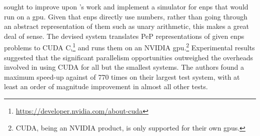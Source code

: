 
\citeauthor{Raghavan2020} \cite{Raghavan2020} sought to improve upon \citeauthor{Florea2018}'s work \cite{Florea2018} and implement a simulator for \gls{enps} that would run on a \gls{gpu}.  Given that \gls{enps} directly use numbers, rather than going through an abstract representation of them such as unary arithmetic, this makes a great deal of sense.  The devised system translates PeP representations of given \gls{enps} problems to CUDA C,\footnote{\url{https://developer.nvidia.com/about-cuda}} and runs them on an NVIDIA \gls{gpu}.\footnote{CUDA, being an NVIDIA product, is only supported for their own \glspl{gpu}.}  Experimental results suggested that the significant parallelism opportunities outweighed the overheads involved in using CUDA for all but the smallest systems.  The authors found a maximum speed-up against \cite{Florea2018} of 770 times on their largest test system, with at least an order of magnitude improvement in almost all other tests.


